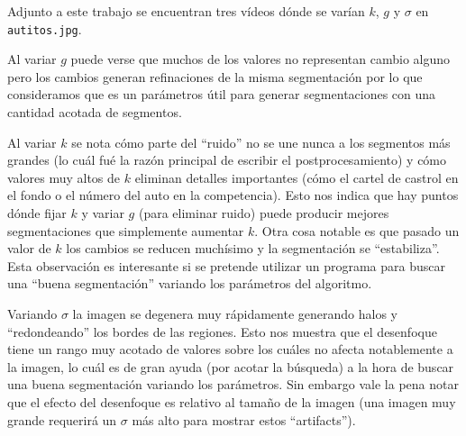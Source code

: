Adjunto a este trabajo se encuentran tres vídeos dónde se varían $k$, $g$ y
$\sigma$ en \texttt{autitos.jpg}.

Al variar $g$ puede verse que muchos de los valores no representan cambio
alguno pero los cambios generan refinaciones de la misma segmentación por lo
que consideramos que es un parámetros útil para generar segmentaciones con una
cantidad acotada de segmentos.

Al variar $k$ se nota cómo parte del ``ruido'' no se une nunca a los segmentos
más grandes (lo cuál fué la razón principal de escribir el postprocesamiento) y
cómo valores muy altos de $k$ eliminan detalles importantes (cómo el cartel de
castrol en el fondo o el número del auto en la competencia). Esto nos indica
que hay puntos dónde fijar $k$ y variar $g$ (para eliminar ruido) puede
producir mejores segmentaciones que simplemente aumentar $k$. Otra cosa notable
es que pasado un valor de $k$ los cambios se reducen muchísimo y la
segmentación se ``estabiliza''. Esta observación es interesante si se pretende
utilizar un programa para buscar una ``buena segmentación'' variando los
parámetros del algoritmo.

Variando $\sigma$ la imagen se degenera muy rápidamente generando halos y
``redondeando'' los bordes de las regiones. Esto nos muestra que el desenfoque
tiene un rango muy acotado de valores sobre los cuáles no afecta notablemente a
la imagen, lo cuál es de gran ayuda (por acotar la búsqueda) a la hora de
buscar una buena segmentación variando los parámetros. Sin embargo vale la pena
notar que el efecto del desenfoque es relativo al tamaño de la imagen (una
imagen muy grande requerirá un $\sigma$ más alto para mostrar estos
``artifacts'').

\clearpage
